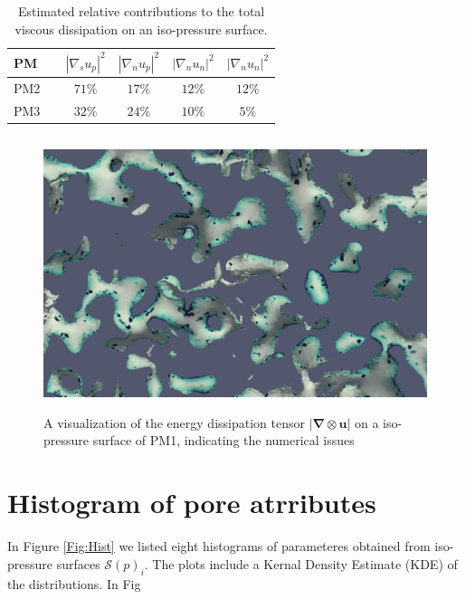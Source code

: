 \documentclass[draft,jgrga]{agutexSI2019}
\begin{document}
\begin{table}[htbp!]\label{tab:sm1}
\centering
\begin{tabular}{l|c|c|c|c|c}
PM & & $\left|\nabla_s u_p\right|^2$ & $ \left|\nabla_n u_p\right|^2$ & $\left|\nabla_n u_n\right|^2$ & $\left|\nabla_n u_n\right|^2$ \\
\hline
PM2 &  & $71 \%$ & $17\%$ & $12\%$ & $12\%$ \\
PM3 &  & $32 \%$ & $24\%$ & $10\%$ & $5\%$ \\
\end{tabular}
\caption{\label{tab:table-name}Estimated relative contributions to the total viscous dissipation on an iso-pressure surface. }
\end{table}




\begin{figure}
\noindent\includegraphics[height=8cm]{figures/nummeric_noise.png}
\caption{A visualization of the energy dissipation tensor $|\mathbf{\nabla}\otimes \mathbf{u}|$ on a iso-pressure surface of PM1, indicating the numerical issues}
\label{fig:numerical noise}
\end{figure}



\section{Histogram of pore atrributes}

In Figure \ref{Fig:Hist} we listed eight histograms of parameteres obtained from iso-pressure surfaces $\mathcal{S}(p)_i$.
The plots include a Kernal Density Estimate (KDE) of the distributions. In Fig 
\end{document}
